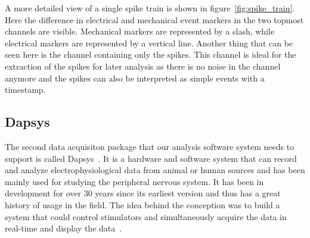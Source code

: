 A more detailed view of a single spike train is shown in figure~\ref{fig:spike_train}. Here the difference in electrical and mechanical event markers in the two topmost channels are visible. Mechanical markers are represented by a slash, while electrical markers are represented by a vertical line. Another thing that can be seen here is the channel containing only the spikes. This channel is ideal for the extraction of the spikes for later analysis as there is no noise in the channel anymore and the spikes can also be interpreted as simple events with a timestamp.

\subsection{Dapsys}

The second data acquisiton package that our analysis software system needs to support is called Dapsys~\cite{dapsys}. It is a hardware and software system that can record and analyze electrophysiological data from animal or human sources and has been mainly used for studying the peripheral nervous system. It has been in development for over 30 years since its earliest version and thus has a great history of usage in the field. The idea behind the conception was to build a system that could control stimulators and simultaneously acquire the data in real-time and display the data~\cite{dapsysArticle}.

